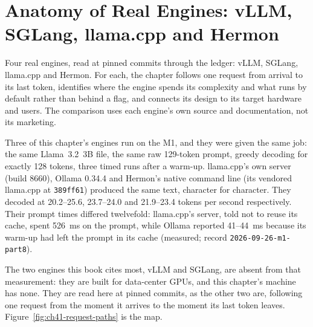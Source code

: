 \chapter{Anatomy of Real Engines: vLLM, SGLang, llama.cpp and Hermon}\label{ch:real-engines}

\begin{ChapterIntent}
Four real engines, read at pinned commits through the ledger: vLLM,
SGLang, llama.cpp and Hermon. For each, the chapter follows one request from
arrival to its last token, identifies where the engine spends its complexity
and what runs by default rather than behind a flag, and connects its design to
its target hardware and users. The comparison uses each engine's own source and
documentation, not its marketing.
\end{ChapterIntent}


Three of this chapter's engines run on the M1, and they were given the same
job: the same Llama~3.2~3B file, the same raw 129-token prompt, greedy
decoding for exactly 128 tokens, three timed runs after a warm-up. llama.cpp's
own server (build 8660), Ollama 0.34.4 and Hermon's native command line (its
vendored llama.cpp at \texttt{389ff61}) produced the same text, character for
character. They decoded at 20.2--25.6, 23.7--24.0 and 21.9--23.4 tokens per
second respectively. Their prompt times differed twelvefold: llama.cpp's server,
told not to reuse its cache, spent 526~ms on the prompt, while Ollama reported
41--44~ms because its warm-up had left the prompt in its cache (measured; record
\texttt{2026-09-26-m1-part8}).

The two engines this book cites most, vLLM and SGLang, are absent from that
measurement: they are built for data-center GPUs, and this chapter's machine has
none. They are read here at pinned commits, as the other two are, following one
request from the moment it arrives to the moment its last token leaves.
Figure~\ref{fig:ch41-request-paths} is the map.



